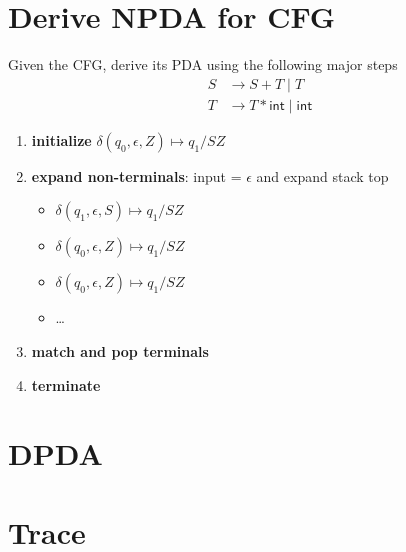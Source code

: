 \documentclass[10pt,a4paper,landscape]{article}
\newcommand{\gor}{\;|\;}
\begin{document}
\begin{multicols*}{3}
\section*{Derive NPDA for CFG}
Given the CFG, derive its PDA using the following major steps
\begin{align*}
  S &\rightarrow S + T \gor T\\
  T &\rightarrow T * \mathsf{int} \gor \mathsf{int}
\end{align*}
\begin{enumerate}
\item \textbf{initialize} \(\delta(q_{0},\epsilon,Z) \mapsto q_{1}/SZ\)
\item \textbf{expand non-terminals}: input = \(\epsilon\) and expand stack top
  \begin{itemize}
  \item \(\delta(q_{1},\epsilon,S) \mapsto q_{1}/SZ\)
  \item \(\delta(q_{0},\epsilon,Z) \mapsto q_{1}/SZ\)
  \item \(\delta(q_{0},\epsilon,Z) \mapsto q_{1}/SZ\)
  \item \ldots
  \end{itemize}
\item \textbf{match and pop terminals}
\item \textbf{terminate}
\end{enumerate}

\section*{DPDA}
\section*{Trace}

\end{multicols*}
\end{document}
